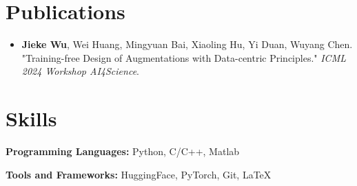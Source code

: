 \documentclass{resume}
\begin{document}
\section{Publications}
\begin{itemize}
  \item \textbf{Jieke Wu}, Wei Huang, Mingyuan Bai, Xiaoling Hu, Yi Duan, Wuyang Chen. "Training-free Design of Augmentations with Data-centric Principles." \emph{ICML 2024 Workshop AI4Science}.
\end{itemize}

\section{Skills}
\textbf{Programming Languages:} Python, C/C++, Matlab

\textbf{Tools and Frameworks:} HuggingFace, PyTorch, Git, \LaTeX
\end{document}
